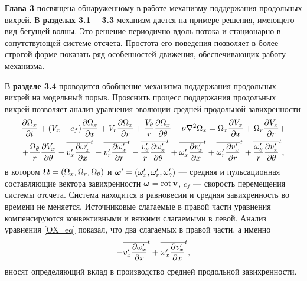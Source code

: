 \textbf{Глава 3} посвящена обнаруженному в работе механизму поддержания продольных вихрей. В \textbf{разделах 3.1 -- 3.3} механизм дается на примере решения, имеющего вид бегущей волны. Это решение периодично вдоль потока и стационарно в сопутствующей системе отсчета. Простота его поведения позволяет в более строгой форме показать ряд особенностей движения, обеспечивающих работу механизма. 

В \textbf{разделе 3.4} проводится обобщение механизма поддержания продольных вихрей на модельный порыв. 
Прояснить процесс поддержания продольных вихрей позволяет анализ уравнения эволюции средней продольной завихренности
\begin{multline}\label{OX_eq}
\frac{\partial \Omega_x}{\partial t} + (V_x - c_f)\frac{\partial \Omega_x}{\partial x} + V_r \frac{\partial \Omega_x}{\partial r} + \frac{V_\theta}{r} \frac{\partial \Omega_x}{\partial \theta} - \nu\nabla^2\Omega_x= \Omega_x \frac{\partial V_x}{\partial x} + \Omega_r \frac{\partial V_x}{\partial r} + \\ + \frac{\Omega_\theta}{r} \frac{\partial V_x}{\partial \theta}
 - \overline{v'_x \frac{\partial \omega'_x}{\partial x}}^t - \overline{v'_r \frac{\partial \omega'_x}{\partial r}}^t - \overline{\frac{v'_\theta}{r} \frac{\partial \omega'_x}{\partial \theta}}^t
 + \overline{\omega'_x \frac{\partial v'_x}{\partial x}}^t + \overline{\omega'_r \frac{\partial v'_x}{\partial r}}^t + \overline{\frac{\omega'_\theta}{r} \frac{\partial v'_x}{\partial \theta}}^t,
\end{multline}
в котором $\mbox{\boldmath$\Omega$} = (\Omega_x, \Omega_r, \Omega_\theta)$ и $\mbox{\boldmath$\omega$}' = (\omega'_x, \omega'_r, \omega'_\theta)$ --- средняя и пульсационная составляющие вектора завихренности $\mbox{\boldmath$\omega$} = \mathop{}\!\operatorname{rot} \mathbf{v}$, $c_f$ --- скорость перемещения системы отсчета. Система находится в равновесии и средняя завихренность во времени не меняется. Источниковые слагаемые в правой части уравнения компенсируются конвективными и вязкими слагаемыми в левой. Анализ уравнения \eqref{OX_eq} показал, что два слагаемых в правой части, а именно
\begin{equation}\label{OXgen_terms}
- \overline{v'_x \frac{\partial \omega'_x}{\partial x}}^t + \overline{ \omega'_x \frac{\partial v'_x}{\partial x} }^t,
\end{equation}
вносят определяющий вклад в производство средней продольной завихренности. 

